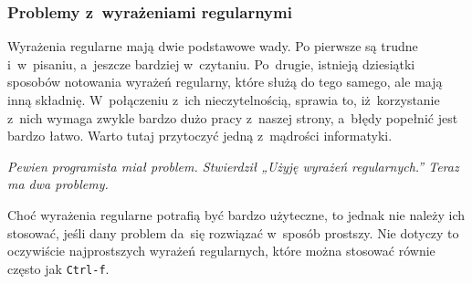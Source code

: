 \documentclass[10pt,t]{beamer}
\begin{document}
\begin{frame}
  \frametitle{Problemy z~wyrażeniami regularnymi}


  Wyrażenia regularne mają dwie podstawowe wady. Po pierwsze są trudne
  i~w~pisaniu, a~jeszcze bardziej w~czytaniu. Po~drugie, istnieją dziesiątki
  sposobów notowania wyrażeń regularny, które służą do tego samego, ale mają
  inną składnię. W~połączeniu z~ich nieczytelnością, sprawia to,
  iż~korzystanie z~nich wymaga zwykle bardzo dużo pracy z~naszej strony,
  a~błędy popełnić jest bardzo łatwo. Warto tutaj przytoczyć jedną
  z~mądrości informatyki.

  \textit{Pewien programista miał problem. Stwierdził „Użyję wyrażeń
    regularnych.” Teraz ma dwa problemy.}

  Choć wyrażenia regularne potrafią być bardzo użyteczne, to jednak nie
  należy ich stosować, jeśli dany problem da~się rozwiązać w~sposób
  prostszy. Nie dotyczy to oczywiście najprostszych wyrażeń regularnych,
  które można stosować równie często jak \texttt{Ctrl-f}.

\end{frame}
\end{document}
